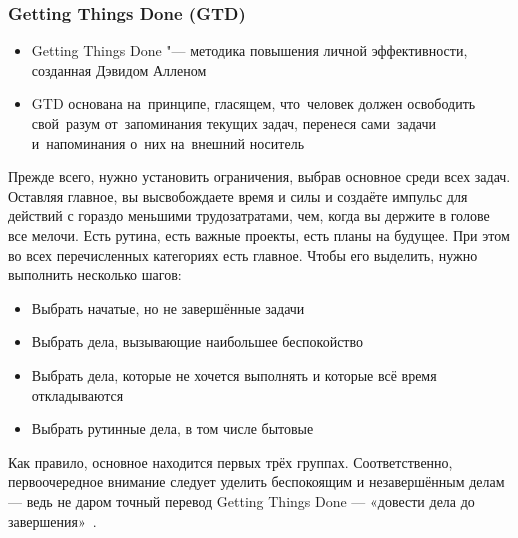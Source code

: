 \documentclass{../industrial-development}
\begin{document}
\begin{frame} \frametitle{Getting Things Done (GTD)}
  \begin{itemize}
  \item Getting Things Done "--- методика повышения личной эффективности, созданная Дэвидом Алленом
  \item GTD основана на~принципе, гласящем, что~человек должен освободить свой~разум от~запоминания текущих задач, перенеся сами~задачи и~напоминания о~них на~внешний носитель
  \end{itemize}
\end{frame}


\lecturenotes

Прежде всего, нужно установить ограничения, выбрав основное среди всех задач. Оставляя главное, вы высвобождаете время и силы и создаёте импульс для действий с гораздо меньшими трудозатратами, чем, когда вы держите в голове все мелочи. Есть рутина, есть важные проекты, есть планы на будущее. При этом во всех перечисленных категориях есть главное. Чтобы его выделить, нужно выполнить несколько шагов:
  \begin{itemize}
  \item Выбрать начатые, но не завершённые задачи
  \item Выбрать дела, вызывающие наибольшее беспокойство
  \item Выбрать дела, которые не хочется выполнять и которые всё время откладываются
  \item Выбрать рутинные дела, в том числе бытовые
  \end{itemize}
Как правило, основное находится первых трёх группах. Соответственно, первоочередное внимание следует уделить беспокоящим и незавершённым делам — ведь не даром точный перевод Getting Things Done — «довести дела до завершения»~\cite{GTDHabr}.
\end{document}
